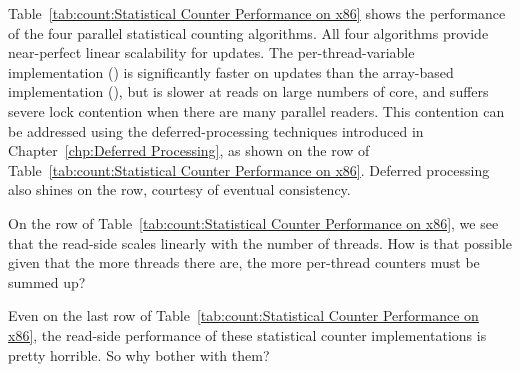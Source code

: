 Table~\ref{tab:count:Statistical Counter Performance on x86}
shows the performance of the four parallel statistical counting
algorithms.
All four algorithms provide near-perfect linear scalability for updates.
The per-thread-variable implementation ()
is significantly faster on
updates than the array-based implementation
(), but is slower at reads on large numbers of core,
and suffers severe lock contention when there are many parallel readers.
This contention can be addressed using the deferred-processing
techniques introduced in
Chapter~\ref{chp:Deferred Processing},
as shown on the  row of
Table~\ref{tab:count:Statistical Counter Performance on x86}.
Deferred processing also shines on the  row,
courtesy of eventual consistency.

\QuickQuiz{}
	On the  row of
	Table~\ref{tab:count:Statistical Counter Performance on x86},
	we see that the read-side scales linearly with the number of
	threads.
	How is that possible given that the more threads there are,
	the more per-thread counters must be summed up?
 \QuickQuizEnd

\QuickQuiz{}
	Even on the last row of
	Table~\ref{tab:count:Statistical Counter Performance on x86},
	the read-side performance of these statistical counter
	implementations is pretty horrible.
	So why bother with them?
 \QuickQuizEnd

